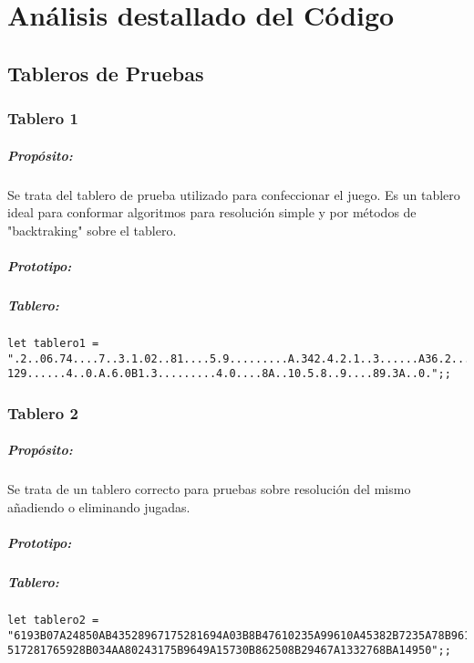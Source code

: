\chapter{Análisis destallado del Código}

\section{Tableros de Pruebas}

\subsection{Tablero 1}
\paragraph{Propósito:} Se trata del tablero de prueba utilizado para
confeccionar el juego. Es un tablero ideal para conformar algoritmos para
resolución simple y por métodos de "backtraking" sobre el tablero.
\paragraph{Prototipo:}
\paragraph{Tablero:} 
\begin{verbatim}
let tablero1 =
".2..06.74....7..3.1.02..81....5.9.........A.342.4.2.1..3......A36.2..........8.
129......4..0.A.6.0B1.3.........4.0....8A..10.5.8..9....89.3A..0.";;
\end{verbatim}

\subsection{Tablero 2}
\paragraph{Propósito:} Se trata de un tablero correcto para pruebas sobre
resolución del mismo añadiendo o eliminando jugadas.
\paragraph{Prototipo:}
\paragraph{Tablero:}
\begin{verbatim}
let tablero2 =
"6193B07A24850AB43528967175281694A03B8B47610235A99610A45382B7235A78B96104B4390A6
517281765928B034AA80243175B9649A15730B862508B29467A1332768BA14950";;
\end{verbatim}

